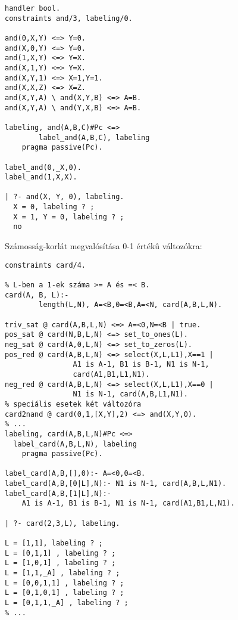 \begin{verbatim}
handler bool.
constraints and/3, labeling/0. 

and(0,X,Y) <=> Y=0.                      
and(X,0,Y) <=> Y=0.                      
and(1,X,Y) <=> Y=X.                      
and(X,1,Y) <=> Y=X.                      
and(X,Y,1) <=> X=1,Y=1.                  
and(X,X,Z) <=> X=Z.                      
and(X,Y,A) \ and(X,Y,B) <=> A=B.         
and(X,Y,A) \ and(Y,X,B) <=> A=B.         
                                      
labeling, and(A,B,C)#Pc <=> 
        label_and(A,B,C), labeling               
    pragma passive(Pc).        
                               
label_and(0,_X,0).      
label_and(1,X,X).      

| ?- and(X, Y, 0), labeling.   
  X = 0, labeling ? ;          
  X = 1, Y = 0, labeling ? ;
  no
\end{verbatim}

Számosság-korlát megvalósítása 0-1 értékû változókra:

\begin{verbatim}
constraints card/4.

% L-ben a 1-ek száma >= A és =< B.
card(A, B, L):-  
        length(L,N), A=<B,0=<B,A=<N, card(A,B,L,N).

triv_sat @ card(A,B,L,N) <=> A=<0,N=<B | true.          
pos_sat @ card(N,B,L,N) <=> set_to_ones(L).             
neg_sat @ card(A,0,L,N) <=> set_to_zeros(L).            
pos_red @ card(A,B,L,N) <=> select(X,L,L1),X==1 |       
                A1 is A-1, B1 is B-1, N1 is N-1, 
                card(A1,B1,L1,N1).
neg_red @ card(A,B,L,N) <=> select(X,L,L1),X==0 | 
                N1 is N-1, card(A,B,L1,N1).
% speciális esetek két változóra
card2nand @ card(0,1,[X,Y],2) <=> and(X,Y,0).           
% ...
labeling, card(A,B,L,N)#Pc <=> 
  label_card(A,B,L,N), labeling
    pragma passive(Pc).

label_card(A,B,[],0):- A=<0,0=<B.
label_card(A,B,[0|L],N):- N1 is N-1, card(A,B,L,N1).
label_card(A,B,[1|L],N):- 
    A1 is A-1, B1 is B-1, N1 is N-1, card(A1,B1,L,N1).

| ?- card(2,3,L), labeling.

L = [1,1], labeling ? ;      
L = [0,1,1] , labeling ? ; 
L = [1,0,1] , labeling ? ;   
L = [1,1,_A] , labeling ? ; 
L = [0,0,1,1] , labeling ? ; 
L = [0,1,0,1] , labeling ? ; 
L = [0,1,1,_A] , labeling ? ;  
% ...
\end{verbatim}

